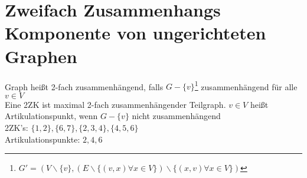      \section{Zweifach Zusammenhangs Komponente von ungerichteten Graphen}
        Graph heißt 2-fach zusammenhängend, falls $G-\{v\}$\footnote{$G'=\left(V\backslash\{v\},\left(E\backslash\{(v,x)\forall x\in V\}
        \right)\backslash\{(x,v)\forall x\in V\}\right)$} zusammenhängend für alle $v\in V$\\
        Eine 2ZK ist maximal 2-fach zusammenhängender Teilgraph. $v\in V$ heißt Artikulationspunkt, wenn $G-\{v\}$ nicht zusammenhängend\\
        

        2ZK's: $\{1,2\},\{6,7\},\{2,3,4\},\{4,5,6\}$\\
        Artikulationspunkte: $2,4,6$
        
